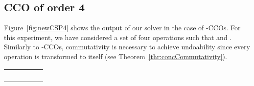 \documentclass[submission,copyright,creativecommons]{eptcs}
\begin{document}
\subsection{CCO of order 4}
Figure~\ref{fig:newCSP4} shows the output of our solver in the case of -CCOs. For this experiment, we have considered a set of four operations  such that  and  . Similarly to -CCOs, commutativity is  necessary to achieve undoability  since every operation is transformed to itself (see Theorem~\ref{thr:concCommutativity}).
\begin{table*}[htbp]  
		\centering \begin{small}  
      \begin{tabular}{|c|c|c|c|c|}
\hline
&   &   &  &     \\ \hline
& &  && \\ \hline 
& &  && \\ \hline 
& &  && \\ \hline
& &  && \\ \hline
\end{tabular}
     \end{small} 
   \label{fig:newCSP4}
\end{table*}
\vspace{-.4cm} 
\end{document}
